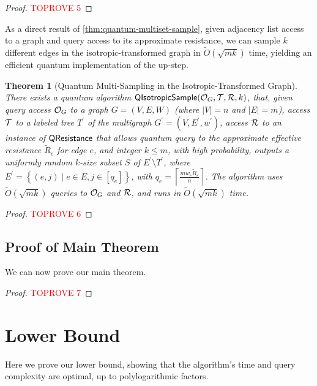 \documentclass[11pt]{article}
\newtheorem{theorem}{Theorem} \newtheorem{lemma}[theorem]{Lemma} \newtheorem{proposition}[theorem]{Proposition} \newtheorem{corollary}[theorem]{Corollary} \newtheorem{definition}[theorem]{Definition} \newtheorem{conjecture}[theorem]{Conjecture} \newtheorem{claim}[theorem]{Claim} \newtheorem{fact}[theorem]{Fact}
\newcommand{\ceil}[1]{\left\lceil #1 \right\rceil}
\newcommand{\abss}[1]{\left\lvert #1 \right\rvert}
\newcommand{\parens}[1]{( #1 )}
\newcommand{\sqb}[1]{\left[ #1 \right]}
\newcommand{\set}[1]{\left\{ #1 \right\}}
\begin{document}
{\begin{proof}\textcolor{red}{TOPROVE 5}\end{proof}


As a direct result of \cref{thm:quantum-multiset-sample},
given adjacency list access to a graph and query access
to its approximate resistance,
we can sample $k$ different edges in
the isotropic-transformed graph in $\widetilde{O}(\sqrt{mk})$
time, 
yielding an efficient quantum implementation of the up-step.

\begin{theorem}[Quantum  Multi-Sampling in the Isotropic-Transformed Graph]\label{thm:quantum-algo-for-isotropic-sampling}
  There exists a quantum algorithm
  $\mathsf{QIsotropicSample}(\mathcal{O}_G, \mathcal{T}, \mathcal{R}, k)$,
  that, 
  given query access $\mathcal{O}_G$ to a graph $G = (V, E, W)$ 
  (where
  $\abss{V} = n$ and $\abss{E} = m$), 
  access $\mathcal{T}$ to a labeled tree $T^\prime$ of the multigraph $G^\prime=\parens{V,E^\prime, w^\prime}$, access $\mathcal{R}$ to an instance of $\mathsf{QResistance}$
  that allows quantum query to the approximate effective resistance
  $\widetilde{R}_e$ for edge $e$, and integer $k \le m$, with high probability,
  outputs a uniformly random $k$-size subset $S$ of $E^\prime\setminus T^\prime$,
  where
  $E^\prime=\set{(e,j) \mid e \in E, j \in \sqb{q_e} }$, 
  with
  $q_e=\ceil{\frac{mw_e\widetilde{R}_e}{n}}$.
  The algorithm uses $\widetilde{O}(\sqrt{mk})$ queries to $\mathcal{O}_G$ and $\mathcal{R}$, and runs in
  $\widetilde{O}(\sqrt{mk})$ time.
\end{theorem}

\begin{proof}\textcolor{red}{TOPROVE 6}\end{proof}


\subsection{Proof of Main Theorem}
We can now prove our main theorem.
\begin{proof}\textcolor{red}{TOPROVE 7}\end{proof}






\section{Lower Bound}

Here we prove our lower bound, showing that the algorithm's time and query complexity are optimal, up to polylogarithmic factors.

}
\end{document}
